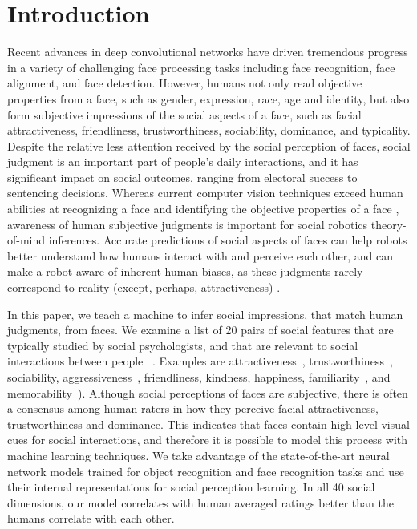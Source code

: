 \documentclass[10pt,twocolumn,letterpaper]{article}
\begin{document}
\section{Introduction}
Recent advances in deep convolutional networks have driven tremendous progress in a variety of challenging face processing tasks including face recognition\cite{taigman2014deepface}, face alignment\cite{zhu2015face}, and face detection\cite{Stewart_2016_CVPR}. However, humans not only read objective properties from a face, such as gender, expression, race, age and identity, but also form subjective impressions of the social aspects of a face\cite{todorov2013social,todorov2015social}, such as facial attractiveness\cite{thornhill1999facial}, friendliness, trustworthiness\cite{todorov2008evaluating}, sociability, dominance\cite{mignault2003many}, and typicality. Despite the relative less attention received by the social perception of faces, social judgment is an important part of people's daily interactions, and it has significant impact on social outcomes, ranging from electoral success to sentencing decisions\cite{oosterhof2008functional, willis2006first}. Whereas current computer vision techniques exceed human abilities at recognizing a face and identifying the objective properties of a face \cite{taigman2014deepface, Stewart_2016_CVPR}, awareness of human subjective judgments is important for social robotics theory-of-mind inferences. Accurate predictions of social aspects of faces can help robots better understand how humans interact with and perceive each other, and can make a robot aware of inherent human biases, as these judgments rarely correspond to reality (except, perhaps,  attractiveness) \cite{todorov2015social}.  

In this paper, we teach a machine to infer social impressions, that match human judgments, from faces. We examine a list of 20 pairs of social features that are typically studied by social psychologists, and that are relevant to social interactions between people
~\cite{todorov2008understanding,todorov2015social, oosterhof2008functional}. Examples are  attractiveness~\cite{grammer1994human, thornhill1999facial, eisenthal2006facial, kagian2008machine, gray2010predicting}, trustworthiness~\cite{falvello2015robustness, todorov2008evaluating}, sociability, aggressiveness~\cite{mignault2003many}, friendliness, kindness, happiness, familiarity~\cite{peskin2004familiarity}, and memorability~\cite{bainbridge2013intrinsic, khosla2013modifying}). Although social perceptions of faces are subjective, there is often a  consensus among human raters in how they perceive facial attractiveness,  trustworthiness and dominance\cite{falvello2015robustness, eisenthal2006facial}. This indicates that faces contain high-level visual cues for social interactions, and therefore it is possible to model this process with machine learning techniques. We take advantage of the state-of-the-art neural network models trained for object recognition and face recognition tasks and use their internal representations for social perception learning. In all 40 social dimensions, our model correlates with human averaged ratings better than the humans correlate with each other. 
\end{document}
